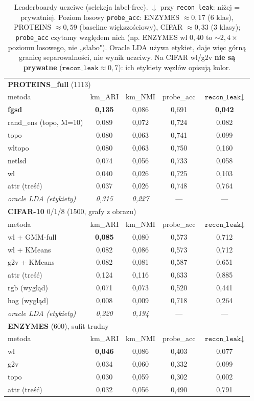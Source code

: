\documentclass[11pt,a4paper]{article}
\newcommand{\rl}{\texttt{recon\_leak}}
\begin{document}
\begin{table}[h]
\centering\small
\begin{tabular}{lcccc}
\toprule
\multicolumn{5}{l}{\textbf{PROTEINS\_full} (1113)} \\
metoda & km\_ARI & km\_NMI & probe\_acc & $\rl\downarrow$ \\
\midrule
\textbf{fgsd} & \textbf{0,135} & 0,086 & 0,691 & \textbf{0,042} \\
rand\_ens (topo, M=10) & 0,089 & 0,072 & 0,724 & 0,082 \\
topo & 0,080 & 0,063 & 0,741 & 0,099 \\
wltopo & 0,080 & 0,063 & 0,750 & 0,160 \\
netlsd & 0,074 & 0,056 & 0,733 & 0,058 \\
wl & 0,040 & 0,026 & 0,725 & 0,103 \\
attr (tre\'s\'c) & 0,037 & 0,026 & 0,748 & 0,764 \\
\textit{oracle LDA (etykiety)} & \textit{0,315} & \textit{0,227} & --- & --- \\
\midrule
\multicolumn{5}{l}{\textbf{CIFAR-10} 0/1/8 (1500, grafy z obrazu)} \\
metoda & km\_ARI & km\_NMI & probe\_acc & $\rl\downarrow$ \\
\midrule
wl + GMM-full & \textbf{0,085} & 0,080 & 0,573 & 0,712 \\
wl + KMeans & 0,082 & 0,086 & 0,573 & 0,712 \\
g2v + KMeans & 0,082 & 0,081 & 0,587 & 0,651 \\
attr (tre\'s\'c) & 0,124 & 0,116 & 0,633 & 0,885 \\
rgb (wygl\k{a}d) & 0,071 & 0,073 & 0,520 & 0,441 \\
hog (wygl\k{a}d) & 0,008 & 0,009 & 0,718 & 0,264 \\
\textit{oracle LDA (etykiety)} & \textit{0,220} & \textit{0,194} & --- & --- \\
\midrule
\multicolumn{5}{l}{\textbf{ENZYMES} (600), sufit trudny} \\
metoda & km\_ARI & km\_NMI & probe\_acc & $\rl\downarrow$ \\
\midrule
wl & \textbf{0,046} & 0,086 & 0,403 & 0,077 \\
g2v & 0,034 & 0,060 & 0,332 & 0,099 \\
topo & 0,030 & 0,059 & 0,302 & 0,002 \\
attr (tre\'s\'c) & 0,032 & 0,056 & 0,490 & 0,791 \\
\bottomrule
\end{tabular}
\caption{Leaderboardy uczciwe (selekcja label-free). $\downarrow$ przy \rl: ni\.zej = prywatniej.
Poziom losowy \texttt{probe\_acc}: ENZYMES $\approx0{,}17$ (6 klas), PROTEINS $\approx0{,}59$
(baseline wi\k{e}kszo\'sciowy), CIFAR $\approx0{,}33$ (3 klasy); \texttt{probe\_acc} czytamy
wzgl\k{e}dem nich (np. ENZYMES wl $0{,}40$ to $\sim\!2{,}4\times$ poziomu losowego, nie „s\l abo").
Oracle LDA u\.zywa etykiet, daje wi\k{e}c g\'orn\k{a} granic\k{e} separowalno\'sci, nie wynik uczciwy.
Na CIFAR wl/g2v \textbf{nie s\k{a} prywatne} ($\rl\approx0{,}7$): ich etykiety w\k{e}z\l\'ow opisuj\k{a} kolor.}
\label{tab:lb}
\end{table}
\end{document}
